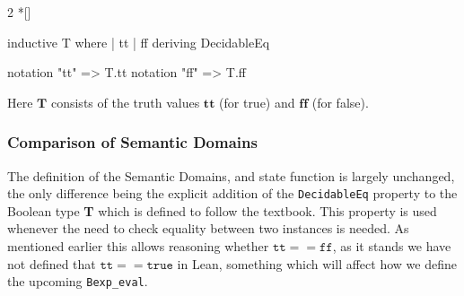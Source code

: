 \begin{paracol}{2}
\switchcolumn[1]*[]
\begin{leftcolumn}
    \begin{Lean_Code}
inductive T where
  | tt
  | ff
  deriving DecidableEq

notation "tt" => T.tt
notation "ff" => T.ff
    \end{Lean_Code}
\end{leftcolumn}
\begin{rightcolumn}
    Here \(\mathbf{T}\) consists of the truth values \(\mathbf{tt}\) (for true) and \(\mathbf{ff}\) (for false).
\end{rightcolumn}
\end{paracol}
\vspace{1em}
\subsubsection*{Comparison of Semantic Domains}
The definition of the Semantic Domains, and state function is largely unchanged, the only difference
being the explicit addition of the \texttt{DecidableEq} property to the Boolean type
\textbf{T} which is defined to follow the textbook.
This property is used whenever the need to check equality between two instances is needed.
As mentioned earlier this allows reasoning whether \(\mathtt{tt} == \mathtt{ff}\), as it stands we have not
defined that \(\mathtt{tt} == \mathtt{true}\) in Lean, something which will affect
how we define the upcoming \texttt{Bexp\_eval}.


